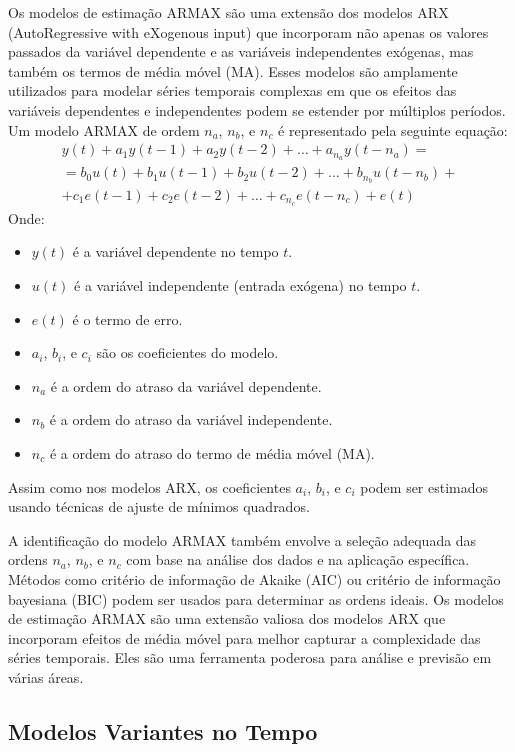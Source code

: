 \documentclass[a4paper,12pt]{article}
\begin{document}
Os modelos de estimação ARMAX são uma extensão dos modelos ARX (AutoRegressive with eXogenous input) que incorporam não apenas os valores passados da variável dependente e as variáveis independentes exógenas, mas também os termos de média móvel (MA). Esses modelos são amplamente utilizados para modelar séries temporais complexas em que os efeitos das variáveis dependentes e independentes podem se estender por múltiplos períodos. Um modelo ARMAX de ordem \(n_a\), \(n_b\), e \(n_c\) é representado pela seguinte equação:
\begin{align*}
    y(t) + a_1 y(t-1) + a_2 y(t-2) + \ldots + a_{n_a} y(t-n_a) = \\
    = b_0 u(t) + b_1 u(t-1) + b_2 u(t-2) + \ldots + b_{n_b} u(t-n_b) + \\
    + c_1 e(t-1) + c_2 e(t-2) + \ldots + c_{n_c} e(t-n_c) + e(t)\tag{2.12.1}
\end{align*}
Onde:
\begin{itemize}
    \item \(y(t)\) é a variável dependente no tempo \(t\).
    \item \(u(t)\) é a variável independente (entrada exógena) no tempo \(t\).
    \item \(e(t)\) é o termo de erro.
    \item \(a_i\), \(b_i\), e \(c_i\) são os coeficientes do modelo.
    \item \(n_a\) é a ordem do atraso da variável dependente.
    \item \(n_b\) é a ordem do atraso da variável independente.
    \item \(n_c\) é a ordem do atraso do termo de média móvel (MA).
\end{itemize}
Assim como nos modelos ARX, os coeficientes \(a_i\), \(b_i\), e \(c_i\) podem ser estimados usando técnicas de ajuste de mínimos quadrados.

A identificação do modelo ARMAX também envolve a seleção adequada das ordens \(n_a\), \(n_b\), e \(n_c\) com base na análise dos dados e na aplicação específica. Métodos como critério de informação de Akaike (AIC) ou critério de informação bayesiana (BIC) podem ser usados para determinar as ordens ideais. Os modelos de estimação ARMAX são uma extensão valiosa dos modelos ARX que incorporam efeitos de média móvel para melhor capturar a complexidade das séries temporais. Eles são uma ferramenta poderosa para análise e previsão em várias áreas.

\subsection{Modelos Variantes no Tempo}
\end{document}
